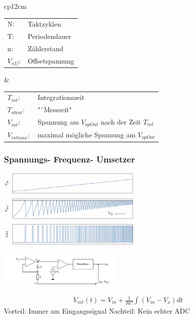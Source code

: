 \begin{longtable}{cp{12cm}}
  
  \begin{tabular}{ll}
      N:&Taktzyklen\\
      T:&Periodendauer\\
      n:&Zählerstand\\
      $V_{off}$:&Offsetspannung\\
  \end{tabular}
  &
  
  \begin{tabular}{ll}
      $T_{int}$:&Integrationszeit\\
      $T_{abint}$:& "`Messzeit"\\
      $V_{int}$:&Spannung am $V_{opOut}$ nach der Zeit $T_{int}$\\
      $V_{intmax}:$&maximal mögliche Spannung am $V_{opOut}$\\
  \end{tabular}
\end{longtable}

\subsubsection{Spannungs- Frequenz- Umsetzer }
\begin{multicols}{2}
	\begin{center}
  		\includegraphics[width=7cm]{pictures/sfu_kurven}
  	\end{center}
  
  \columnbreak
  
  \includegraphics[width=6cm]{pictures/sfu_schaltung}
  
   \begin{align*}
      V_{int}(t)=V_{in}+\frac{1}{RC}\int(V_{in}-V_{x})dt
   \end{align*}
    Vorteil: Immer am Eingangssignal\newline
    Nachteil: Kein echter ADC  
\end{multicols}


